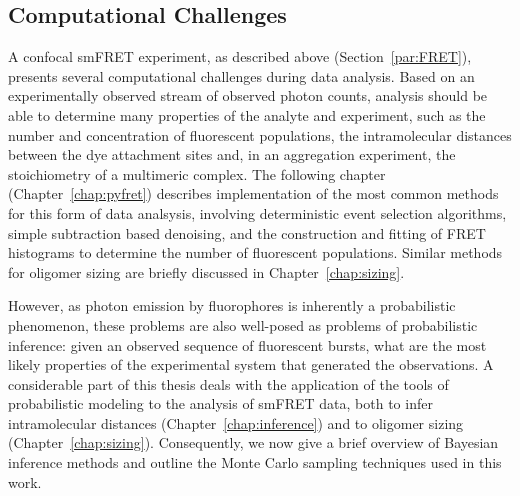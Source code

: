 \subsection{Computational Challenges}
A confocal smFRET experiment, as described above (Section~\ref{par:FRET}), presents several computational challenges during data analysis. Based on an experimentally observed stream of observed photon counts, analysis should be able to determine many properties of the analyte and experiment, such as the number and concentration of fluorescent populations, the intramolecular distances between the dye attachment sites and, in an aggregation experiment, the stoichiometry of a multimeric complex. The following chapter (Chapter~\ref{chap:pyfret}) describes implementation of the most common methods for this form of data analsysis, involving deterministic event selection algorithms, simple subtraction based denoising, and the construction and fitting of FRET histograms to determine the number of fluorescent populations. Similar methods for oligomer sizing are briefly discussed in Chapter~\ref{chap:sizing}. 

However, as photon emission by fluorophores is inherently a probabilistic phenomenon, these problems are also well-posed as problems of probabilistic inference: given an observed sequence of fluorescent bursts, what are the most likely properties of the experimental system that generated the observations. A considerable part of this thesis deals with the application of the tools of probabilistic modeling to the analysis of smFRET data, both to infer intramolecular distances (Chapter~\ref{chap:inference}) and to oligomer sizing (Chapter~\ref{chap:sizing}). Consequently, we now give a brief overview of Bayesian inference methods and outline the Monte Carlo sampling techniques used in this work.  



